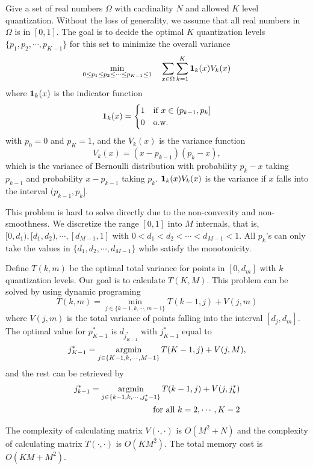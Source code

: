 Give a set of real numbers $\Omega$ with cardinality $N$ and allowed $K$ level quantization. Without the loss of generality, we assume that all real numbers in $\Omega$ is in $[0, 1]$. The goal is to decide the optimal $K$ quantization levels $\{p_1, p_2, \cdots, p_{K-1}\}$ for this set to minimize the overall variance
\begin{align}
\min_{0\leq p_1\leq p_2 \leq \cdots \leq p_{K-1} \leq 1}\quad \sum_{x\in \Omega} \sum_{k=1}^K {\bf 1}_k(x)V_k(x)
\end{align}
where ${\bf 1}_k(x)$ is the indicator function
\[
{\bf 1}_k(x) = 
\begin{cases}
1 & \text{if}~x\in (p_{k-1}, p_k] \\
0 & \text{o.w.}
\end{cases}
\]
with $p_0=0$ and $p_K=1$, and the $V_k(x)$ is the variance function 
\[
V_k(x) = (x-p_{k-1})(p_k - x), 
\]
which is the variance of Bernoulli distribution with probability $p_k-x$ taking $p_{k-1}$ and probability $x-p_{k-1}$ taking $p_k$. ${\bf 1}_k(x)V_k(x)$ is the variance if $x$ falls into the interval $(p_{k-1}, p_k]$. 

This problem is hard to solve directly due to the non-convexity and non-smoothness. We discretize the range $[0,1]$ into $M$ internals, that is, $[0,d_1), [d_1, d_2), \cdots, [d_{M-1}, 1]$ with $0< d_1<d_2<\cdots < d_{M-1}<1$. All $p_k$'s can only take the values in $\{d_1, d_2, \cdots, d_{M-1}\}$ while satisfy the monotonicity.

Define $T(k, m)$ be the optimal total variance for points in $[0, d_m]$ with $k$ quantization levels. Our goal is to calculate $T(K, M)$. This problem can be solved by using dynamic programing
\[
T(k, m) = \min_{j\in \{k-1, k, \cdots, m-1\}} T(k-1,j) + V(j,m)
\]
where $V(j,m)$ is the total variance of points falling into the interval $[d_j, d_m]$. The optimal value for $p_{K-1}^*$ is $ d_{j^*_{K-1}}$ with $j^*_{K-1}$ equal to
\[
j^*_{K-1} = \operatorname*{argmin}_{j\in \{K-1, k, \cdots, M-1\}} T(K-1,j) + V(j,M),
\]
and the rest can be retrieved by 
\begin{align*}
j^*_{k-1} = \operatorname*{argmin}_{j\in \{k-1, k, \cdots, j^*_k-1\}} T(k-1, j) + V(j, j^*_k) \\
\text{for all}~k=2, \cdots, K-2
\end{align*}

The complexity of calculating matrix $V(\cdot, \cdot)$ is $O(M^2 + N)$ and the complexity of calculating matrix $T(\cdot, \cdot)$ is $O(KM^2)$. The total memory cost is $O(KM + M^2)$.